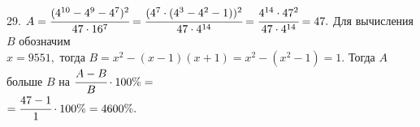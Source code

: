 29. $A=\cfrac{(4^{10}-4^9-4^7)^2}{47\cdot16^7}=\cfrac{(4^7\cdot(4^3-4^2-1))^2}{47\cdot4^{14}}=\cfrac{4^{14}\cdot47^2}{47\cdot4^{14}}=47.$ Для вычисления $B$ обозначим\\ $x=9551,$ тогда $B=x^2-(x-1)(x+1)=x^2-(x^2-1)=1.$ Тогда $A$ больше $B$ на $\cfrac{A-B}{B}\cdot100\%=$\\$=\cfrac{47-1}{1}\cdot100\%=4600\%.$\\
